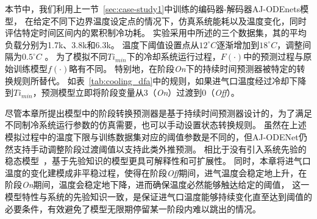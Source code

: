 本节中，我们利用上一节~\ref{sec:case-study1}中训练的编码器-解码器AJ-ODEnets模型，
在给定不同下边界温度设定点的情况下，仿真系统能耗以及温度变化，同时评估特定时间区间内的累积制冷功耗。
实验采用中所述的三个数据集，其的平均负载分别为1.7k、3.8k和6.3k。
温度下阈值设置点从$12^{\circ}C$逐渐增加到$18^{\circ}C$，调整间隔为$0.5^{\circ}C$ 。
为了模拟不同$Ti_{min}$下的冷却系统运行过程，$F(\cdot)$中的预测过程与原始训练模型$f(\cdot)$略有不同。
特别地，在阶段\textit{On}下的持续时间预测器被特定的转换规则所替代。
如表~\ref{tab:cooling_dfa}中的规则，如果进气口温度经过冷却下降到$Ti_{min}$，预测模型立即将阶段变量从3（\textit{On}）过渡到0（\textit{Off}）。

    尽管本章所提出模型中的阶段转换预测器是基于持续时间预测器设计的，为了满足不同制冷系统运行参数的仿真需要，也可以手动设置状态转换规则。
    虽然在上述模拟过程中的温度下限与训练数据集对应的阈值参数是不同的，但AJ-ODENet仍然支持手动调整阶段过渡阈值以支持此类外推预测。
    相比于没有引入系统先验的稳态模型~\cite{Yilmaz2007}，基于先验知识的模型更具可解释性和可扩展性。
    同时，本章将进气口温度的变化建模成非平稳过程，使得在阶段\textit{Off}期间，进气温度会稳定地上升，在阶段\textit{On}期间，温度会稳定地下降，进而确保温度必然能够触达给定的阈值，
    这一模型特性与系统的先验知识一致，是保证进气口温度能够持续变化直至达到阈值的必要条件，有效避免了模型无限期停留某一阶段内难以跳出的情况。

